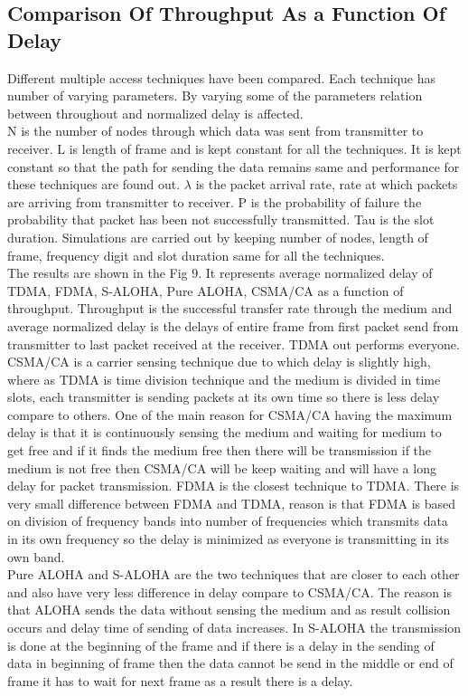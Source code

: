 \documentclass[11pt, conference, compsocconf, onecolumn]{IEEEtran}
\begin{document}
\subsection{Comparison Of Throughput As a Function Of Delay}
Different multiple access techniques have been compared. Each technique has number of varying parameters. By varying some of the parameters relation between throughout and normalized delay is affected.
\\
\indent N is the number of nodes through which data was sent from transmitter to receiver. L is length of frame and is kept constant for all the techniques. It is kept constant so that the path for sending the data remains same and performance for these techniques are found out. $\lambda$ is the packet arrival rate, rate at which packets are arriving from transmitter to receiver. P is the probability of failure the probability that packet has been not successfully transmitted. Tau is the slot duration. Simulations are carried out by keeping number of nodes, length of frame, frequency digit and slot duration same for all the techniques.
\\
\indent The results are shown in the Fig 9. It represents average normalized delay of TDMA, FDMA, S-ALOHA, Pure ALOHA, CSMA/CA as a function of throughput. Throughput is the successful transfer rate through the medium and average normalized delay is the delays of entire frame from first packet send from transmitter to last packet received at the receiver. TDMA out performs everyone.
\\
\indent CSMA/CA is a carrier sensing technique due to which delay is slightly high, where as TDMA is time division technique and the medium is divided in time slots, each transmitter is sending packets at its own time so there is less delay compare to others. One of the main reason for CSMA/CA having the maximum delay is that it is continuously sensing the medium and waiting for medium to get free and if it finds the medium free then there will be transmission if the medium is not free then CSMA/CA will be keep waiting and will have a long delay for packet transmission. FDMA is the closest technique to TDMA. There is very small difference between FDMA and TDMA, reason is that FDMA is based on division of frequency bands into number of frequencies which transmits data in its own frequency so the delay is minimized as everyone is transmitting in its own band.
\\
\indent Pure ALOHA and S-ALOHA are the two techniques that are closer to each other and also have very less difference in delay compare to CSMA/CA. The reason is that ALOHA sends the data without sensing the medium and as result collision occurs and delay time of sending of data increases. In S-ALOHA the transmission is done at the beginning of the frame and if there is a delay in the sending of data in beginning of frame then the data cannot be send in the middle or end of frame it has to wait for next frame as a result there is a delay.
\end{document}
